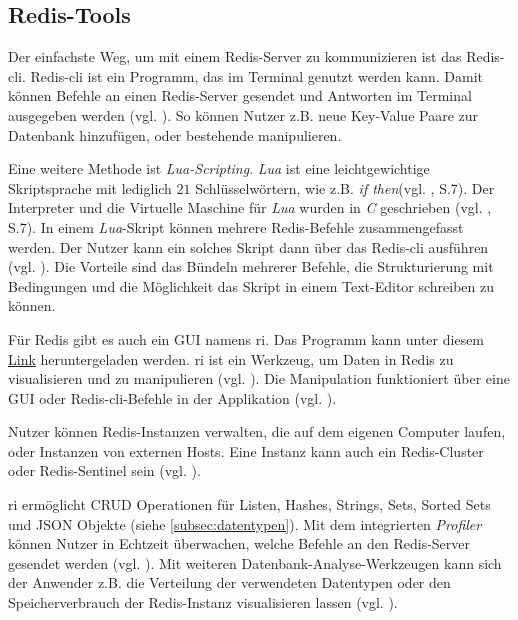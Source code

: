 
\subsection{Redis-Tools}
\label{subsec:tools}

Der einfachste Weg, um mit einem \ac{Redis}-Server zu kommunizieren ist das \ac{Redis-cli}. \ac{Redis-cli} ist ein Programm, das im Terminal genutzt werden kann. Damit können Befehle an einen \ac{Redis}-Server gesendet und Antworten im Terminal ausgegeben werden (vgl. \cite{Redis-Docs-cli}). So können Nutzer z.B. neue Key-Value Paare zur Datenbank hinzufügen, oder bestehende manipulieren.

Eine weitere Methode ist \textit{Lua-Scripting}. \textit{Lua} ist eine leichtgewichtige Skriptsprache mit lediglich $21$ Schlüsselwörtern, wie z.B. \glqq \textit{if then}\grqq (vgl. \cite{17}, S.7). Der Interpreter und die Virtuelle Maschine für \textit{Lua} wurden in \textit{C} geschrieben (vgl. \cite{17}, S.7). In einem \textit{Lua}-Skript können mehrere \ac{Redis}-Befehle zusammengefasst werden. Der Nutzer kann ein solches Skript dann über das \ac{Redis-cli} ausführen (vgl. \cite{Redis-Docs-cli}). Die Vorteile sind das Bündeln mehrerer Befehle, die Strukturierung mit Bedingungen und die Möglichkeit das Skript in einem Text-Editor schreiben zu können.

Für \ac{Redis} gibt es auch ein \ac{GUI} namens \gls{ri}. Das Programm kann unter diesem \href{https://redis.com/redis-enterprise/redis-insight/?_gl=1*128mfio*_ga*OTc4MjQ4NDk1LjE3MDI2NjI1MzY.*_ga_8BKGRQKRPV*MTcwMjcxMzU2Ny4zLjEuMTcwMjcyMTEyNS42MC4wLjA.*_gcl_au*MTYxMzA5MjQ2MS4xNzAyNjYyNTM2&_ga=2.55945451.1702553176.1702662536-978248495.1702662536}{Link} heruntergeladen werden. \gls{ri} ist ein Werkzeug, um Daten in \ac{Redis} zu visualisieren und zu manipulieren (vgl. \cite{Redis-Docs-RI}). Die Manipulation funktioniert über eine \ac{GUI} oder \ac{Redis-cli}-Befehle in der Applikation (vgl. \cite{Redis-Docs-RI}). 

Nutzer können \ac{Redis}-Instanzen verwalten, die auf dem eigenen Computer laufen, oder Instanzen von externen Hosts. Eine Instanz kann auch ein \ac{Redis}-Cluster oder \ac{Redis}-Sentinel sein (vgl. \cite{Redis-Docs-RI}).

\gls{ri} ermöglicht \ac{CRUD} Operationen für Listen, Hashes, Strings, Sets, Sorted Sets und JSON Objekte (siehe \autoref{subsec:datentypen}). Mit dem integrierten \textit{Profiler} können Nutzer in Echtzeit überwachen, welche Befehle an den \ac{Redis}-Server gesendet werden (vgl. \cite{Redis-Docs-RI}). Mit weiteren Datenbank-Analyse-Werkzeugen kann sich der Anwender z.B. die Verteilung der verwendeten Datentypen oder den Speicherverbrauch der \ac{Redis}-Instanz visualisieren lassen (vgl. \cite{Redis-Docs-RI}).